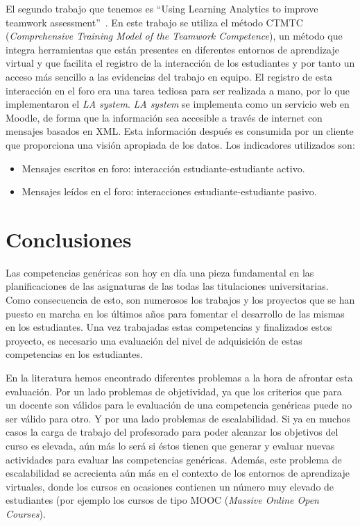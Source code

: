 \bigskip
El segundo trabajo que tenemos es “Using Learning Analytics to improve teamwork assessment”~\cite{fidalgo:2015}. En este trabajo se utiliza el método CTMTC (\emph{Comprehensive Training Model of the Teamwork Competence}), un método que integra herramientas que están presentes en diferentes entornos de aprendizaje virtual y que facilita el registro de la interacción de los estudiantes y por tanto un acceso más sencillo a las evidencias del trabajo en equipo. El registro de esta interacción en el foro era una tarea tediosa para ser realizada a mano, por lo que implementaron el \emph{LA system}. \emph{LA system} se implementa como un servicio web en Moodle, de forma que la información sea accesible a través de internet con mensajes basados en XML. Esta información después es consumida por un cliente que proporciona una visión apropiada de los datos. Los indicadores utilizados son:

\begin{itemize}
\item Mensajes escritos en foro: interacción estudiante-estudiante activo.
\item Mensajes leídos en el foro:  interacciones estudiante-estudiante pasivo.
\end{itemize}

\section{Conclusiones}

Las competencias genéricas son hoy en día una pieza fundamental en las planificaciones de las asignaturas de las todas las titulaciones universitarias. Como consecuencia de esto, son numerosos los trabajos y los proyectos que se han puesto en marcha en los últimos años para fomentar el desarrollo de las mismas en los estudiantes. Una vez trabajadas estas competencias y finalizados estos proyecto, es necesario una evaluación del nivel de adquisición de estas competencias en los estudiantes.

En la literatura hemos encontrado diferentes problemas a la hora de afrontar esta evaluación. Por un lado problemas de objetividad, ya que los criterios que para un docente son válidos para le evaluación de una competencia genéricas puede no ser válido para otro. Y por una lado problemas de escalabilidad. Si ya en muchos casos la carga de trabajo del profesorado para poder alcanzar los objetivos del curso es elevada, aún más lo será si éstos tienen que generar y evaluar nuevas actividades para evaluar las competencias genéricas. Además, este problema de escalabilidad se acrecienta aún más en el contexto de los entornos de aprendizaje virtuales, donde los cursos en ocasiones contienen un número muy elevado de estudiantes (por ejemplo los cursos de tipo MOOC (\emph{Massive Online Open Courses}).

